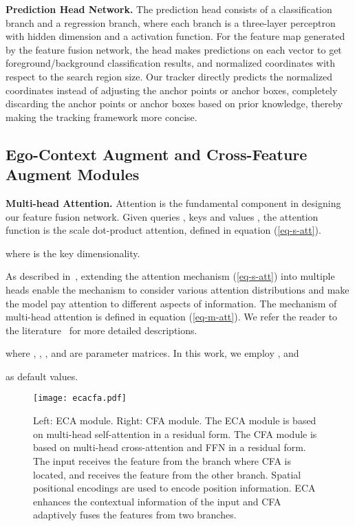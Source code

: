 \documentclass[final]{cvpr}
\begin{document}
{\noindent \textbf{Prediction Head Network.}} 
The prediction head consists of a classification branch and a regression branch, where each branch is a three-layer perceptron with hidden dimension  and a  activation function. 
For the feature map  generated by the feature fusion network, the head makes predictions on 
each vector to get  foreground/background classification results, and  normalized coordinates with respect 
to the search region size. 
Our tracker directly predicts the normalized coordinates instead of adjusting the anchor points or anchor boxes, completely discarding the anchor points or anchor boxes based on prior knowledge, thereby making the tracking framework more concise.

\subsection{Ego-Context Augment and Cross-Feature Augment Modules}
\label{section:CFAECA}
{\noindent \textbf{Multi-head Attention. }}
Attention is the fundamental component in designing our feature fusion network. 
Given queries , keys  and values , the attention 
function is the scale dot-product attention, defined in equation (\ref{eq-s-att}).

where  is the key dimensionality. 


As described in~\cite{2017Attention}, extending the attention mechanism (\ref{eq-s-att}) 
into multiple heads enable the mechanism to consider various attention distributions and make the model 
pay attention to different aspects of information. The mechanism of multi-head attention 
is defined in equation (\ref{eq-m-att}). We refer the reader to the literature~\cite{2017Attention} 
for more detailed descriptions. 


where , , , and  are parameter matrices. 
In this work, we employ ,  and 

as default values.

\begin{figure}[t]
\begin{center}
\texttt{[image: ecacfa.pdf]}
\end{center}
   \caption{Left: ECA module. Right: CFA module. The ECA module is based on multi-head self-attention in a residual form. The CFA module is based on multi-head cross-attention and FFN in a residual form. The input  receives the feature from the branch where CFA is located, and  receives the feature from the other branch. Spatial positional encodings are used to encode position information. ECA enhances the contextual information of the input and CFA adaptively fuses the features from two branches.}
\label{fig:ECACFA}
\end{figure}
\end{document}
